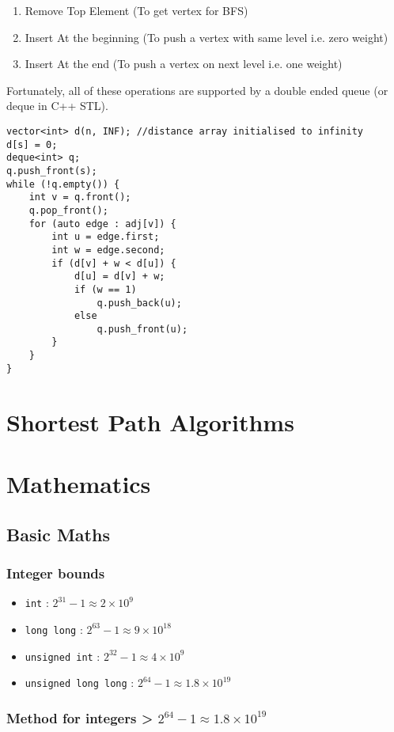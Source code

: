 \documentclass[twoside,12pt,a4paper,english]{book}
\theoremstyle{definition}
\theoremstyle{problemstyle}
\begin{document}
\begin{enumerate}
    \item Remove Top Element (To get vertex for BFS)
    \item Insert At the beginning (To push a vertex with same level i.e. zero weight)
    \item Insert At the end (To push a vertex on next level i.e. one weight)
\end{enumerate}
Fortunately, all of these operations are supported by a double ended queue (or deque in C++ STL).
\newpage
\begin{lstlisting}
vector<int> d(n, INF); //distance array initialised to infinity
d[s] = 0;
deque<int> q;
q.push_front(s);
while (!q.empty()) {
    int v = q.front();
    q.pop_front();
    for (auto edge : adj[v]) {
        int u = edge.first;
        int w = edge.second;
        if (d[v] + w < d[u]) {
            d[u] = d[v] + w;
            if (w == 1)
                q.push_back(u);
            else
                q.push_front(u);
        }
    }
}
\end{lstlisting}

\part{Shortest Path Algorithms}
\part{Mathematics}
\chapter{Basic Maths}

\section{Integer bounds}

\begin{itemize}
    \item\texttt{int} :  $2^{31} - 1 \approx 2\times10^9$
    \item\texttt{long long} :  $2^{63} - 1 \approx 9\times10^{18}$
    \item\texttt{unsigned int} :  $2^{32} - 1 \approx 4\times10^9$
    \item\texttt{unsigned long long} :  $2^{64} - 1 \approx 1.8\times10^{19}$
\end{itemize}

\section{Method for integers > $2^{64} - 1 \approx 1.8\times10^{19}$}
\end{document}
